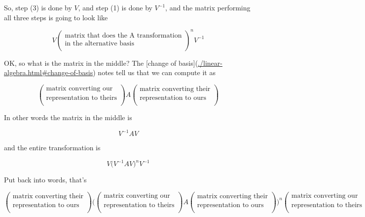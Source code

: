 So, step (3) is done by $V$, and step (1) is done by $V^{-1}$, and the matrix
performing all three steps is going to look like

$$
V
\begin{pmatrix}\text{matrix that does the A transformation}\\\text{in the alternative basis} \\ \end{pmatrix}^n
V^{-1}
$$

OK, so what is the matrix in the middle? The
[change of basis](\url{./linear-algebra.html#change-of-basis}) notes tell us that we
can compute it as

$$
\begin{pmatrix}\text{matrix converting our}\\\text{representation to theirs} \\ \end{pmatrix}
A
\begin{pmatrix}\text{matrix converting their}\\\text{representation to ours} \\ \end{pmatrix}
$$

In other words the matrix in the middle is

$$
V^{-1}AV
$$

and the entire transformation is

$$
V
\Big(V^{-1}AV\Big)^n
V^{-1}
$$

Put back into words, that's

$$
\begin{pmatrix}\text{matrix converting their}\\\text{representation to ours} \\ \end{pmatrix}
\Bigg(
    \begin{pmatrix}\text{matrix converting our}\\\text{representation to theirs} \\ \end{pmatrix}
    A
    \begin{pmatrix}\text{matrix converting their}\\\text{representation to ours} \\ \end{pmatrix}
\Bigg)^n
\begin{pmatrix}\text{matrix converting our}\\\text{representation to theirs} \\ \end{pmatrix}
$$




